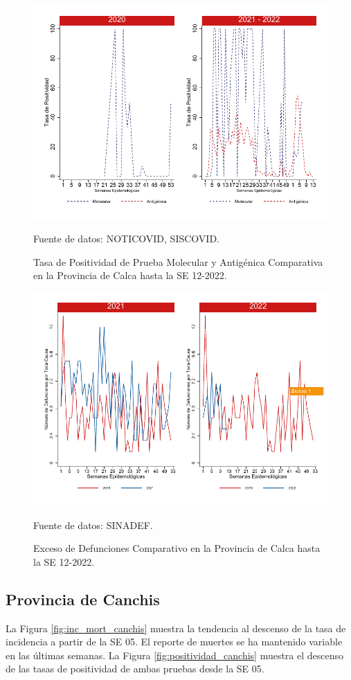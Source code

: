 \documentclass[12pt,a4paper,openany]{book}
\begin{document}
		\begin{figure}[h]
			\caption{Tasa de Positividad de Prueba Molecular y Antigénica Comparativa en la Provincia de Calca hasta la SE 12-2022.}\label{fig:positividad_calca}
			\begin{center}
				\includegraphics[width=0.7\linewidth]{../figuras/positividad_20_21_4.pdf}
			\end{center}
			{\footnotesize {Fuente de datos: NOTICOVID, SISCOVID.}}
		\end{figure}
		
		\begin{figure}[h]
			\caption{Exceso de Defunciones Comparativo en la Provincia de Calca hasta la SE 12-2022.}\label{fig:exceso_calca}
			\begin{center}
				\includegraphics[width=0.7\linewidth]{../figuras/exceso_4.pdf}
			\end{center}
			{\footnotesize {Fuente de datos: SINADEF.}}
		\end{figure}
		
		\clearpage
		
		\subsection*{Provincia de Canchis}
		\noindent La Figura \ref{fig:inc_mort_canchis} muestra la tendencia al descenso de la tasa de incidencia a partir de la SE 05. El reporte de muertes se ha mantenido variable en las últimas semanas.   
		\noindent La Figura \ref{fig:positividad_canchis} muestra el descenso de las tasas de positividad de ambas pruebas desde la SE 05.
		
\end{document}
